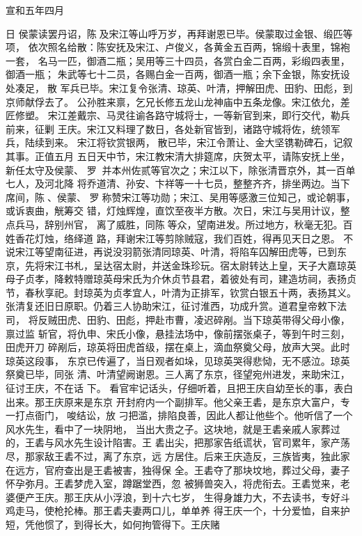 宣和五年四月

日
侯蒙读罢丹诏，陈及宋江等山呼万岁，再拜谢恩已毕。侯蒙取过金银、缎匹等项，
依次照名给散：陈安抚及宋江、卢俊义，各黄金五百两，锦缎十表里，锦袍一套，
名马一匹，御酒二瓶；吴用等三十四员，各赏白金二百两，彩缎四表里，御酒一瓶；
朱武等七十二员，各赐白金一百两，御酒一瓶；余下金银，陈安抚设处凑足，散
军兵已毕。宋江复令张清、琼英、叶清，押解田虎、田豹、田彪，到京师献俘去了。
公孙胜来禀，乞兄长修五龙山龙神庙中五条龙像。宋江依允，差匠修塑。
宋江差戴宗、马灵往谕各路守城将士，一等新官到来，即行交代，勒兵前来，征剿
王庆。宋江又料理了数日，各处新官皆到，诸路守城将佐，统领军兵，陆续到来。
宋江将钦赏银两，散已毕，宋江令萧让、金大坚镌勒碑石，记叙其事。正值五月
五日天中节，宋江教宋清大排筵席，庆贺太平，请陈安抚上坐，新任太守及侯蒙、
罗，并本州佐贰等官次之；宋江以下，除张清晋京外，其一百单七人，及河北降
将乔道清、孙安、卞祥等一十七员，整整齐齐，排坐两边。当下席间，陈、侯蒙、
罗称赞宋江等功勋；宋江、吴用等感激三位知己，或论朝事，或诉衷曲，觥筹交
错，灯烛辉煌，直饮至夜半方散。次日，宋江与吴用计议，整点兵马，辞别州官，
离了威胜，同陈等众，望南进发。所过地方，秋毫无犯。百姓香花灯烛，络绎道
路，拜谢宋江等剪除贼寇，我们百姓，得再见天日之恩。
不说宋江等望南征进，再说没羽箭张清同琼英、叶清，将陷车囚解田虎等，已到东
京，先将宋江书札，呈达宿太尉，并送金珠珍玩。宿太尉转达上皇，天子大嘉琼英
母子贞孝，降敕特赠琼英母宋氏为介休贞节县君，着彼处有司，建造坊祠，表扬贞
节，春秋享祀。封琼英为贞孝宜人，叶清为正排军，钦赏白银五十两，表扬其义。
张清复还旧日原职。仍着三人协助宋江，征讨淮西，功成升赏。道君皇帝敕下法司，
将反贼田虎、田豹、田彪，押赴市曹，凌迟碎剐。当下琼英带得父母小像，禀过监
斩官，将仇申、宋氏小像，悬挂法场中，像前摆张桌子，等到午时三刻，田虎开刀
碎剐后，琼英将田虎首级，摆在桌上，滴血祭奠父母，放声大哭。此时琼英这段事，
东京已传遍了，当日观者如垛，见琼英哭得悲恸，无不感泣。琼英祭奠已毕，同张
清、叶清望阙谢恩。三人离了东京，径望宛州进发，来助宋江，征讨王庆，不在话
下。
看官牢记话头，仔细听着，且把王庆自幼至长的事，表白出来。那王庆原来是东京
开封府内一个副排军。他父亲王砉，是东京大富户，专一打点衙门，唆结讼，放
刁把滥，排陷良善，因此人都让他些个。他听信了一个风水先生，看中了一块阴地，
当出大贵之子。这块地，就是王砉亲戚人家葬过的，王砉与风水先生设计陷害。王
砉出尖，把那家告纸谎状，官司累年，家产荡尽，那家敌王砉不过，离了东京，远
方居住。后来王庆造反，三族皆夷，独此家在远方，官府查出是王砉被害，独得保
全。王砉夺了那块坟地，葬过父母，妻子怀孕弥月。王砉梦虎入室，蹲踞堂西，忽
被狮兽突入，将虎衔去。王砉觉来，老婆便产王庆。那王庆从小浮浪，到十六七岁，
生得身雄力大，不去读书，专好斗鸡走马，使枪抡棒。那王砉夫妻两口儿，单单养
得王庆一个，十分爱恤，自来护短，凭他惯了，到得长大，如何拘管得下。王庆赌
